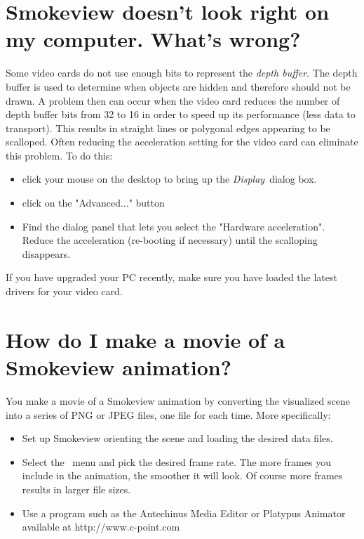\documentclass[11pt,twoside]{book}
\begin{document}
\section{Smokeview doesn't look right on my computer.  What's wrong?}
\label{faq3}

Some video cards do not use enough bits to represent the
{\em depth buffer}. The depth buffer is used to determine
when objects are hidden and therefore should not be drawn.
A problem then can occur when the video card reduces the
number of depth buffer bits from 32 to 16 in order to speed
up its performance (less data to transport). This results
in straight lines or polygonal edges appearing to be
scalloped. Often reducing the acceleration setting for the
video card can eliminate this problem. To do this:

\begin{itemize}

\item click your mouse on the desktop to bring up the
{\em Display}\ dialog box.

\item click on the "Advanced..." button

\item Find the dialog panel that lets you select the
"Hardware acceleration". Reduce the acceleration
(re-booting if necessary) until the scalloping disappears.

\end{itemize}
If you have upgraded your PC recently, make sure you have loaded the latest drivers for your video card.

\section{How do I make a movie of a Smokeview animation?}

You make a movie of a Smokeview animation by converting the
visualized scene into a series of PNG or JPEG files, one
file for each time. More specifically:

\begin{itemize}
\item Set up Smokeview orienting the scene and loading the desired
data files. \item Select the \ menu and
pick the desired frame rate. The more frames you include in the
animation, the smoother it will look. Of course more frames
results in larger file sizes. \item Use a program such as the
Antechinus Media Editor or Platypus Animator available at
http://www.c-point.com
\end{itemize}
\end{document}
